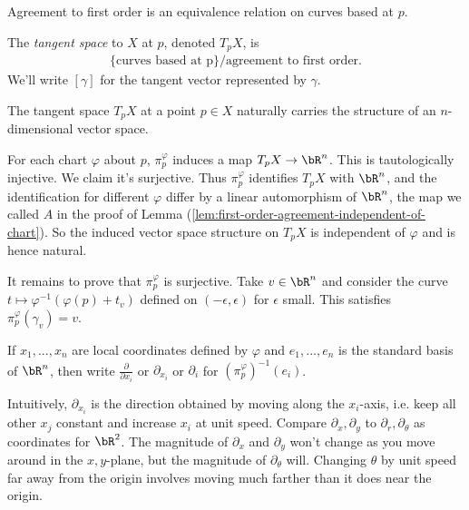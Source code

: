 \begin{cor}
	Agreement to first order is an equivalence relation on curves based at $p$.
\end{cor}
\begin{defn}\label{defn:tangent-space}
	The \emph{tangent space} to $X$ at $p$, denoted $T_pX$, is
	\begin{align*}
		\{\text{curves based at p}\}/\text{agreement to first order}.
	\end{align*}
	We'll write $[\gamma]$ for the tangent vector represented by $\gamma$.
\end{defn}
\begin{prop}\label{prop:tangent-space-is-vspace}
	The tangent space $T_pX$ at a point $p \in X$ naturally carries the structure of an $n$-dimensional vector space.
\end{prop}
\begin{prf}
	For each chart $\varphi$ about $p$, $\pi_p^{\varphi}$ induces a map $T_pX \to \bR^n$. This is tautologically injective. We claim it's surjective. Thus $\pi_p^{\varphi}$ identifies $T_pX$ with $\bR^n$, and the identification for different $\varphi$ differ by a linear automorphism of $\bR^n$, the map we called $A$ in the proof of Lemma (\ref{lem:first-order-agreement-independent-of-chart}). So the induced vector space structure on $T_pX$ is independent of $\varphi$ and is hence natural.

	It remains to prove that $\pi_p^{\varphi}$ is surjective. Take $v \in \bR^n$ and consider the curve $t \mapsto \varphi^{-1}\left(\varphi(p) + t_v\right)$ defined on $(-\epsilon, \epsilon)$ for $\epsilon$ small. This satisfies $\pi_p^{\varphi}(\gamma_v) = v$.
\end{prf}

\begin{defn}\label{defn:basis-of-tangent-space}
	If $x_1,...,x_n$ are local coordinates defined by $\varphi$ and $e_1,...,e_n$ is the standard basis of $\bR^n$, then write $\frac{\partial}{\partial x_i}$ or $\partial_{x_i}$ or $\partial_i$ for $(\pi_p^\varphi)^{-1}(e_i)$.
\end{defn}

Intuitively, $\partial_{x_i}$ is the direction obtained by moving along the $x_i$-axis, i.e. keep all other $x_j$ constant and increase $x_i$ at unit speed. Compare $\partial_x,\partial_y$ to $\partial_r,\partial_\theta$ as coordinates for $\bR^2$. The magnitude of $\partial_x$ and $\partial_y$ won't change as you move around in the $x,y$-plane, but the magnitude of $\partial_\theta$ will. Changing $\theta$ by unit speed far away from the origin involves moving much farther than it does near the origin.

